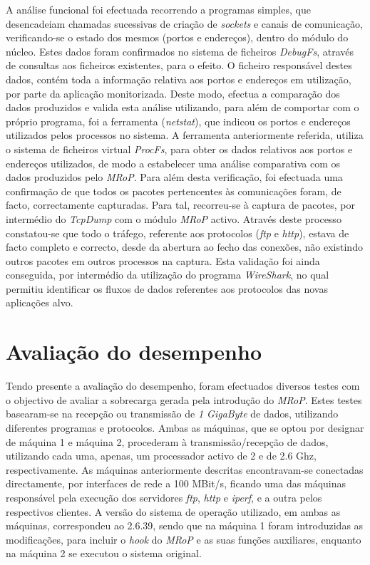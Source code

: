 A análise funcional foi efectuada recorrendo a programas simples, que desencadeiam chamadas sucessivas de criação de \textit{sockets} e canais de comunicação, verificando-se o estado dos mesmos (portos e endereços), dentro do módulo do núcleo.
Estes dados foram confirmados no sistema de ficheiros \textit{DebugFs}, através de consultas aos ficheiros existentes, para o efeito.
O ficheiro responsável destes dados, contém toda a informação relativa aos portos e endereços em utilização, por parte da aplicação monitorizada.
Deste modo, efectua a comparação dos dados produzidos e valida esta análise utilizando, para além de comportar com o próprio programa, foi a ferramenta (\textit{netstat}), que indicou os portos e endereços utilizados pelos processos no sistema.
A ferramenta anteriormente referida, utiliza o sistema de ficheiros virtual \textit{ProcFs}, para obter os dados relativos aos portos e endereços utilizados,  de modo a estabelecer uma análise comparativa com os dados produzidos pelo \textit{MRoP}.
Para além desta verificação, foi efectuada uma confirmação de que todos os pacotes pertencentes às comunicações foram, de facto, correctamente capturadas.
Para tal, recorreu-se à captura de pacotes, por intermédio do \textit{TcpDump} com o módulo \textit{MRoP} activo.
Através deste processo constatou-se que todo o tráfego, referente aos protocolos (\textit{ftp} e \textit{http}), estava de facto completo e correcto, desde da abertura ao fecho das conexões, não existindo outros pacotes em outros processos na captura.
Esta validação foi ainda conseguida, por intermédio da utilização do programa \textit{WireShark}, no qual permitiu identificar os fluxos de dados referentes aos protocolos das novas aplicações alvo.


\section{Avaliação do desempenho}
\label{sec:eval_performance}

Tendo presente a avaliação do desempenho, foram efectuados diversos testes com o objectivo de avaliar a sobrecarga gerada pela introdução do \textit{MRoP}.
Estes testes basearam-se na recepção ou transmissão de \textit{1 GigaByte} de dados, utilizando diferentes programas e protocolos.
Ambas as máquinas, que se optou por designar de máquina 1 e máquina 2, procederam à transmissão/recepção de dados, utilizando cada uma, apenas, um processador activo de 2 e de 2.6 Ghz, respectivamente.
As máquinas anteriormente descritas encontravam-se conectadas directamente, por interfaces de rede a 100 MBit/s, ficando uma das máquinas responsável pela execução dos servidores \textit{ftp}, \textit{http} e \textit{iperf}, e a outra pelos respectivos clientes.
A versão do sistema de operação utilizado, em ambas as máquinas, correspondeu ao 2.6.39, sendo que na máquina 1 foram introduzidas as modificações, para incluir o \textit{hook} do \textit{MRoP} e as suas funções auxiliares, enquanto na máquina 2 se executou o sistema original.

